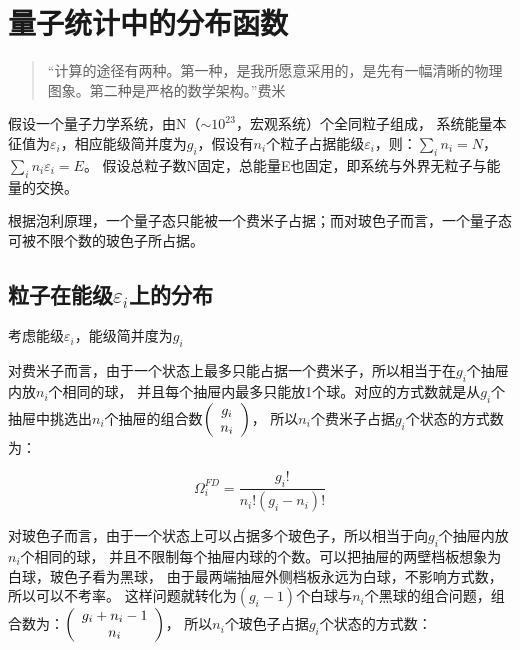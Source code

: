 \section{量子统计中的分布函数}


\begin{quotation}
``计算的途径有两种。第一种，是我所愿意采用的，是先有一幅清晰的物理图象。第二种是严格的数学架构。''\qquad 费米
\end{quotation}




假设一个量子力学系统，由N（$ \sim 10^{23} $，宏观系统）个全同粒子组成，
系统能量本征值为$\varepsilon _i $，相应能级简并度为$g_i $，假设有$n_i$个粒子占据能级$\varepsilon _i $，则：$\sum\limits_i {n_i }  = N$，$\sum\limits_i {n_i \varepsilon _i }  = E$。
假设总粒子数N固定，总能量E也固定，即系统与外界无粒子与能量的交换。

根据泡利原理，一个量子态只能被一个费米子占据；而对玻色子而言，一个量子态可被不限个数的玻色子所占据。


\subsection{粒子在能级$\varepsilon _i $上的分布}

考虑能级$\varepsilon _i $，能级简并度为$g_i $

对费米子而言，由于一个状态上最多只能占据一个费米子，所以相当于在$g_i$个抽屉内放$n_i$个相同的球，
并且每个抽屉内最多只能放1个球。对应的方式数就是从$g_i$个抽屉中挑选出$n_i$个抽屉的组合数$\left( {\begin{array}{*{20}c}
   {g_i }  \\
   {n_i }  \\
\end{array}} \right)$，
所以$n_i$个费米子占据$g_i$个状态的方式数为：


\begin{equation}\label{33-1}
\Omega _i^{FD}  = \frac{{g_i !}}{{n_i !\left( {g_i  - n_i } \right)!}}
\end{equation}

对玻色子而言，由于一个状态上可以占据多个玻色子，所以相当于向$g_i$个抽屉内放$n_i$个相同的球，
并且不限制每个抽屉内球的个数。可以把抽屉的两壁档板想象为白球，玻色子看为黑球，
由于最两端抽屉外侧档板永远为白球，不影响方式数，所以可以不考率。
这样问题就转化为$\left( {g_i  - 1} \right)$个白球与$n_i$个黑球的组合问题，组合数为：$\left( {\begin{array}{*{20}c}
   {g_i  + n_i  - 1}  \\
   {n_i }  \\
\end{array}} \right)$，
所以$n_i$个玻色子占据$g_i$个状态的方式数：

